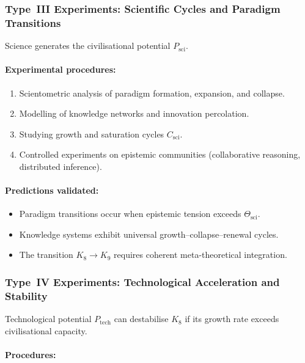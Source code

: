 \subsubsection{Type~III Experiments: Scientific Cycles and Paradigm Transitions}

Science generates the civilisational potential $P_{\mathrm{sci}}$.

\paragraph{Experimental procedures:}

\begin{enumerate}
    \item Scientometric analysis of paradigm formation, expansion, and collapse.
    \item Modelling of knowledge networks and innovation percolation.
    \item Studying growth and saturation cycles $C_{\mathrm{sci}}$.
    \item Controlled experiments on epistemic communities 
          (collaborative reasoning, distributed inference).
\end{enumerate}

\paragraph{Predictions validated:}

\begin{itemize}
    \item Paradigm transitions occur when epistemic tension exceeds 
          $\Theta_{\mathrm{sci}}$.
    \item Knowledge systems exhibit universal growth–collapse–renewal cycles.
    \item The transition $K_8 \to K_9$ requires coherent meta-theoretical integration.
\end{itemize}



\subsubsection{Type~IV Experiments: Technological Acceleration and Stability}

Technological potential $P_{\mathrm{tech}}$ can destabilise $K_8$
if its growth rate exceeds civilisational capacity.

\paragraph{Procedures:}

